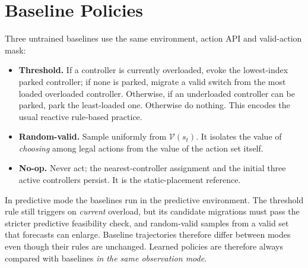 \section{Baseline Policies}
\label{sec:baselines}

Three untrained baselines use the same environment, action API and valid-action mask:
\begin{itemize}[leftmargin=*]
  \item \textbf{Threshold.} If a controller is currently overloaded, evoke the lowest-index parked controller; if none is parked, migrate a valid switch from the most loaded overloaded controller. Otherwise, if an underloaded controller can be parked, park the least-loaded one. Otherwise do nothing. This encodes the usual reactive rule-based practice.
  \item \textbf{Random-valid.} Sample uniformly from $\mathcal{V}(s_t)$. It isolates the value of \emph{choosing} among legal actions from the value of the action set itself.
  \item \textbf{No-op.} Never act; the nearest-controller assignment and the initial three active controllers persist. It is the static-placement reference.
\end{itemize}
In predictive mode the baselines run in the predictive environment. The threshold rule still triggers on \emph{current} overload, but its candidate migrations must pass the stricter predictive feasibility check, and random-valid samples from a valid set that forecasts can enlarge. Baseline trajectories therefore differ between modes even though their rules are unchanged. Learned policies are therefore always compared with baselines \emph{in the same observation mode}.
